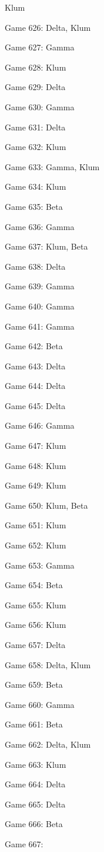 \documentclass{article}
\begin{document}
\begin{multicols}{3}
\begin{compactitem}
Klum
\item Game 626:
Delta, Klum
\item Game 627:
Gamma
\item Game 628:
Klum
\item Game 629:
Delta
\item Game 630:
Gamma
\item Game 631:
Delta
\item Game 632:
Klum
\item Game 633:
Gamma, Klum
\item Game 634:
Klum
\item Game 635:
Beta
\item Game 636:
Gamma
\item Game 637:
Klum, Beta
\item Game 638:
Delta
\item Game 639:
Gamma
\item Game 640:
Gamma
\item Game 641:
Gamma
\item Game 642:
Beta
\item Game 643:
Delta
\item Game 644:
Delta
\item Game 645:
Delta
\item Game 646:
Gamma
\item Game 647:
Klum
\item Game 648:
Klum
\item Game 649:
Klum
\item Game 650:
Klum, Beta
\item Game 651:
Klum
\item Game 652:
Klum
\item Game 653:
Gamma
\item Game 654:
Beta
\item Game 655:
Klum
\item Game 656:
Klum
\item Game 657:
Delta
\item Game 658:
Delta, Klum
\item Game 659:
Beta
\item Game 660:
Gamma
\item Game 661:
Beta
\item Game 662:
Delta, Klum
\item Game 663:
Klum
\item Game 664:
Delta
\item Game 665:
Delta
\item Game 666:
Beta
\item Game 667:

\end{compactitem}
\end{multicols}
\end{document}
